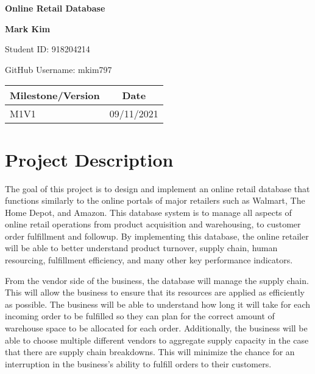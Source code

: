 \documentclass{article}
\let\oldsection\section
\renewcommand\section{\clearpage\oldsection}
\begin{document}
\begin{titlepage}
\begin{center}
	\vspace*{1cm}
	\Huge
	\textbf{Online Retail Database}
	
	\vspace{1.5cm}
	\LARGE
	\textbf{Mark Kim}
	
	\Large
	Student ID: 918204214
	
	GitHub Username: mkim797
	
	\large
	\vspace{1cm}
	\begin{tabular}{ | l | c | }
		\hline
		\textbf{Milestone/Version} & \textbf{Date}\\
		\hline
		M1V1 & 09/11/2021\\
		\hline
	\end{tabular}

\end{center}
\end{titlepage}

\tableofcontents
\pagebreak

\section{Project Description}

The goal of this project is to design and implement an online retail database that functions similarly to the online portals of major retailers such as Walmart, The Home Depot, and Amazon.  This database system is to manage all aspects of online retail operations from product acquisition and warehousing, to customer order fulfillment and followup.  By implementing this database, the online retailer will be able to better understand product turnover, supply chain, human resourcing, fulfillment efficiency, and many other key performance indicators.

From the vendor side of the business, the database will manage the supply chain.  This will allow the business to ensure that its resources are applied as efficiently as possible.  The business will be able to understand how long it will take for each incoming order to be fulfilled so they can plan for the correct amount of warehouse space to be allocated for each order.  Additionally, the business will be able to choose multiple different vendors to aggregate supply capacity in the case that there are supply chain breakdowns.  This will minimize the chance for an interruption in the business's ability to fulfill orders to their customers.
\end{document}
